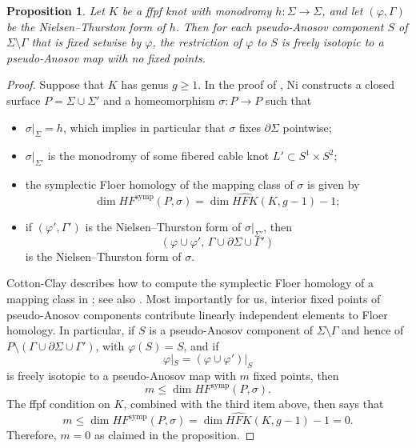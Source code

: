 \documentclass[11pt]{amsart}
\newtheorem {proposition}[theorem]{Proposition}
\numberwithin{equation}{section}
\numberwithin{theorem}{section}
\theoremstyle{definition}
\newcommand\hf{\mathit{HF}}
\newcommand\hfk{\mathit{HFK}}
\newcommand\hfkhat{\widehat{\hfk}}
\newcommand\symp{\mathrm{symp}}
\begin{document}
\begin{proposition} \label{prop:pA-fixed-points}
Let $K$ be a ffpf knot with monodromy $h: \Sigma \to \Sigma$, and let $(\varphi,\Gamma)$ be the Nielsen--Thurston form of $h$. Then for each pseudo-Anosov component $S$ of $\Sigma\setminus \Gamma$ that is fixed setwise by $\varphi$, the restriction of $\varphi$ to $S$ is freely isotopic to a pseudo-Anosov map with no fixed points.
\end{proposition}

\begin{proof}
Suppose that $K$ has genus $g\geq 1$. In the proof of  \cite[Theorem~1.2]{ni-fixed},  Ni constructs a closed surface $P = \Sigma\cup \Sigma'$ and a homeomorphism $\sigma: P \to P$ such that
\begin{itemize}
\item $\sigma|_{\Sigma} = h$, which implies in particular that $\sigma$ fixes $\partial \Sigma$ pointwise;\vspace{1mm}
\item $\sigma|_{\Sigma'}$ is the monodromy of some fibered cable knot $L' \subset S^1\times S^2$;\vspace{1mm}
\item the symplectic Floer homology of the mapping class of $\sigma$ is given by
\[ \dim \hf^\symp(P,\sigma) = \dim \hfkhat(K,g-1) - 1; \]
\item if  $(\varphi',\Gamma')$ is the Nielsen--Thurston form of  $\sigma|_{\Sigma'}$, then \[(\varphi\cup \varphi',\, \Gamma \cup \partial \Sigma \cup \Gamma')\] is the Nielsen--Thurston form of $\sigma$. 
\end{itemize}
Cotton-Clay describes  how to compute the symplectic Floer homology of a mapping class in \cite[Theorem~4.2]{cotton-clay}; see also \cite[Theorem~1.3]{ni-fixed}. Most importantly for us, interior fixed points of pseudo-Anosov components  contribute linearly independent elements to Floer homology. In particular, if $S$ is a pseudo-Anosov component of $\Sigma \setminus \Gamma$ and hence of $P \setminus (\Gamma\cup\partial \Sigma \cup \Gamma')$, with $\varphi(S) = S$, and if \[\varphi|_S = (\varphi\cup \varphi')|_S\] is freely isotopic to a pseudo-Anosov map with $m$ fixed points, then 
 \[m\leq \dim \hf^\symp(P,\sigma).\] The ffpf condition on $K$, combined with the third item above, then says that \[m\leq  \dim \hf^\symp(P,\sigma) = \dim \hfkhat(K,g-1) - 1 = 0. \] Therefore, $m=0$ as claimed in the proposition.
\end{proof}
\end{document}
